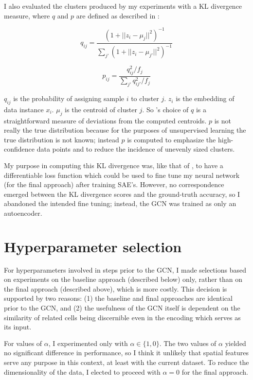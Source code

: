 \documentclass{article}
\begin{document}
I also evaluated the clusters produced by my experiments with a KL divergence measure, where $q$ and $p$ are defined as described in \cite{xie2016unsupervised}:

$$
q_{ij} = \frac
{(1 + ||z_i - \mu_j||^2)^{-1}}
{\sum_{j'}(1 + ||z_i - \mu_{j'}||^2)^{-1}}
$$

$$
p_{ij} = \frac
{q^2_{ij}/f_j}
{\sum_{j'} q^2_{ij'}/f_j}
$$

$q_{ij}$ is the probability of assigning sample $i$ to cluster $j$. $z_i$ is the embedding of data instance $x_i$. $\mu_j$ is the centroid of cluster $j$. So \cite{xie2016unsupervised}'s choice of $q$ is a straightforward measure of deviations from the computed centroids. $p$ is not really the true distribution because for the purposes of unsupervised learning the true distribution is not known; instead $p$ is computed to emphasize the high-confidence data points and to reduce the incidence of unevenly sized clusters.

My purpose in computing this KL divergence was, like that of \cite{xie2016unsupervised}, to have a differentiable loss function which could be used to fine tune my neural network (for the final approach) after training SAE's. However, no correspondence emerged between the KL divergence scores and the ground-truth accuracy, so I abandoned the intended fine tuning; instead, the GCN was trained as only an autoencoder.

\section{Hyperparameter selection}


For hyperparameters involved in steps prior to the GCN, I made selections based on experiments on the baseline approach (described below) only, rather than on the final approach (described above), which is more costly. This decision is supported by two reasons: (1) the baseline and final approaches are identical prior to the GCN, and (2) the usefulness of the GCN itself is dependent on the similarity of related cells being discernible even in the encoding which serves as its input.

For values of $\alpha$, I experimented only with $\alpha \in \{1,0\}$. The two values of $\alpha$ yielded no significant difference in performance, so I think it unlikely that spatial features serve any purpose in this context, at least with the current dataset. To reduce the dimensionality of the data, I elected to proceed with $\alpha = 0$ for the final approach.
\end{document}
